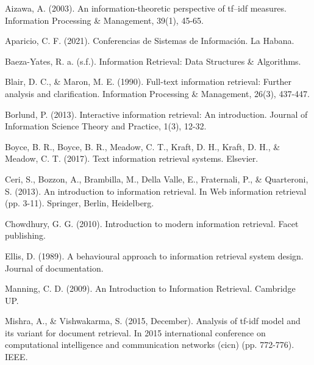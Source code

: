 \documentclass{llncs}
\begin{document}
\tableofcontents
\clearpage



\newpage







\newpage



\newpage



\newpage


%
%
\begin{thebibliography}{}
	
Aizawa, A. (2003). An information-theoretic perspective of tf–idf measures.
Information Processing \& Management, 39(1), 45-65.
	
Aparicio, C. F. (2021). Conferencias de Sistemas de Información. La Habana.

Baeza-Yates, R. a. (s.f.). Information Retrieval: Data Structures \&
Algorithms.

 Blair, D. C., \& Maron, M. E. (1990). Full-text information
retrieval: Further analysis and clarification. Information Processing \&
Management, 26(3), 437-447.

Borlund, P. (2013). Interactive information retrieval: An introduction.
Journal of Information Science Theory and Practice, 1(3), 12-32.

 Boyce, B. R., Boyce, B. R., Meadow, C. T., Kraft, D. H., Kraft, D.
H., \& Meadow, C. T. (2017). Text information retrieval systems. Elsevier.

Ceri, S., Bozzon, A., Brambilla, M., Della Valle, E., Fraternali, P., \&
Quarteroni, S. (2013). An introduction to information retrieval. In Web
information retrieval (pp. 3-11). Springer, Berlin, Heidelberg.

Chowdhury, G. G. (2010). Introduction to modern information retrieval.
Facet publishing.

Ellis, D. (1989). A behavioural approach to information retrieval system
design. Journal of documentation.

Manning, C. D. (2009). An Introduction to Information Retrieval. Cambridge UP.

Mishra, A., \& Vishwakarma, S. (2015, December). Analysis of tf-idf model and
its variant for document retrieval. In 2015 international conference on
computational intelligence and communication networks (cicn) (pp. 772-776). IEEE.


\end{thebibliography}
\end{document}
